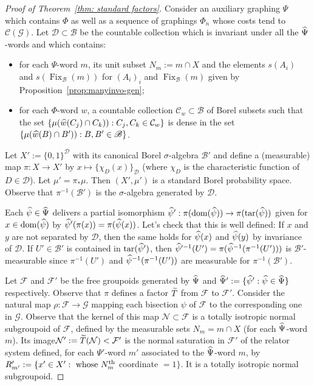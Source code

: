 \documentclass[AHL,Unicode,longabstracts,published]{cedram}
\newcommand{\cost}{\mathcal{C}}
\newcommand{\cn}{\mathcal{N}}
\newcommand{\cg}{\mathcal{G}}
\newcommand{\cf}{\mathcal{F}}
\newcommand{\cd}{\mathcal{D}}
\newcommand{\rb}{\mathscr{B}}
\DeclareMathOperator{\dom}{dom}
\DeclareMathOperator{\tar}{tar}
\DeclareMathOperator{\Fix}{Fix}
\let\oldtilde\tilde
\renewcommand*{\tilde}[1]{\mathchoice{\widetilde{#1}}{\widetilde{#1}}{\oldtilde{#1}}{\oldtilde{#1}}}
\let\oldhat\hat
\renewcommand*{\hat}[1]{\mathchoice{\widehat{#1}}{\widehat{#1}}{\oldhat{#1}}{\oldhat{#1}}}
\begin{document}
\begin{proof}[Proof of Theorem~\ref{thm: standard factors}]
Consider an auxiliary graphing $\Psi$ which contains $\Phi$ as well as a sequence of graphings $\Phi_n$ whose costs tend to $\cost (\cg)$. Let $\cd\subset \rb$ be the countable collection which is invariant under all the $\hat{\Psi}$-words and which contains:
\begin{itemize}
\item for each $\Psi$-word $m$, its unit subset $N_m:=m\cap X$ and the elements $s(A_i)$ and $s(\Fix_{\rb}(m))$ for $(A_i)_i$ and $\Fix_{\rb}(m)$ given by Proposition~\ref{prop:manyinvo-gen};
\item for each $\Phi$-word $w$, a countable collection $\cost_{w}\subset \rb$ of Borel subsets such that the set $\{\mu(\hat{w}(C_j)\cap C_k)): C_j, C_k\in \cost_{w}\}$ is dense in the set $\{\mu(\hat{w}(B)\cap B')): B, B'\in \rb\}$.
\end{itemize}
Let $X':=\{0,1\}^{\cd}$ with its canonical Borel $\sigma$-algebra $\rb'$ and define a (measurable) map $\pi:X\to X'$ by $x\mapsto \{\chi_{D}(x)\}_{\cd}$ (where $\chi_{D}$ is the characteristic function of $D\in \cd$). Let $\mu'=\pi_*\mu$. Then $(X',\mu')$ is a standard Borel probability space. Observe that $\pi^{-1}(\rb')$ is the $\sigma$-algebra generated by $\cd$.

Each $\hat{\psi}\in \hat{\Psi}$ delivers a partial isomorphism $\hat{\psi}':\pi(\dom(\hat{\psi}))\to \pi(\tar(\hat{\psi}))$ given for $x\in \dom(\hat{\psi})$ by $\hat{\psi}'(\pi(x))=\pi(\hat{\psi} (x))$. Let's check that this is well defined: If $x$ and $y$ are not separated by $\cd$, then the same holds for $\hat{\psi}(x)$ and $\hat{\psi}(y)$ by invariance of $\cd$. If $U'\in \rb'$ is contained in $\tar(\hat{\psi}')$, then $\hat{\psi}'^{-1}(U')=\pi(\hat{\psi}^{-1}(\pi^{-1} (U')))$ is $\rb'$-measurable since $\pi^{-1} (U')$ and $\hat{\psi}^{-1}(\pi^{-1} (U'))$ are measurable for $\pi^{-1}(\rb')$.

Let $\cf$ and $\cf'$ be the free groupoids generated by $\hat{\Psi}$ and $\hat{\Psi}':=\{\hat{\psi}': \hat{\psi}\in \hat{\Psi}\}$ respectively. Observe that $\pi$ defines a factor $\tilde{T}$ from $\cf$ to $\cf'$. Consider the natural map $\rho:\cf\to\cg$ mapping each bisection $\psi$ of $\cf$ to the corresponding one in $\cg$. Observe that the kernel of this map $\cn\subset \cf$ is a totally isotropic normal subgroupoid of $\cf$, defined by the measurable sets $N_m=m\cap X$ (for each $\hat{\Psi}$-word $m$). Its image\linebreak$\cn' :=\tilde{T}(\cn)<\cf'$ is the normal saturation in $\cf'$ of the relator system defined, for each $\Psi'$-word $m'$ associated to the $\hat{\Psi}$-word $m$, by $R'_{m'}:=\{x'\in X': \text{ whose } N_m^{\rm th}$  coordinate $=1\}$. It is a totally isotropic normal subgroupoid.


\end{proof}
\end{document}
